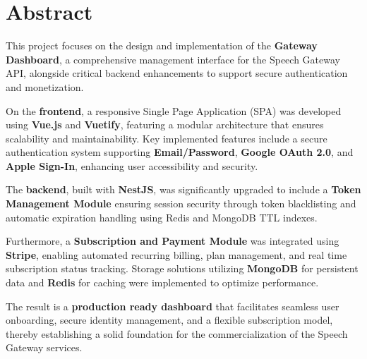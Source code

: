 \chapter*{Abstract}

This project focuses on the design and implementation of the \textbf{Gateway Dashboard}, a comprehensive management interface for the Speech Gateway API, alongside critical backend enhancements to support secure authentication and monetization.

On the \textbf{frontend}, a responsive Single Page Application (SPA) was developed using \textbf{Vue.js} and \textbf{Vuetify}, featuring a modular architecture that ensures scalability and maintainability. Key implemented features include a secure authentication system supporting \textbf{Email/Password}, \textbf{Google OAuth 2.0}, and \textbf{Apple Sign-In}, enhancing user accessibility and security.

The \textbf{backend}, built with \textbf{NestJS}, was significantly upgraded to include a \textbf{Token Management Module} ensuring session security through token blacklisting and automatic expiration handling using Redis and MongoDB TTL indexes. 

Furthermore, a \textbf{Subscription and Payment Module} was integrated using \textbf{Stripe}, enabling automated recurring billing, plan management, and real time subscription status tracking. Storage solutions utilizing \textbf{MongoDB} for persistent data and \textbf{Redis} for caching were implemented to optimize performance.

The result is a \textbf{production ready dashboard} that facilitates seamless user onboarding, secure identity management, and a flexible subscription model, thereby establishing a solid foundation for the commercialization of the Speech Gateway services.

